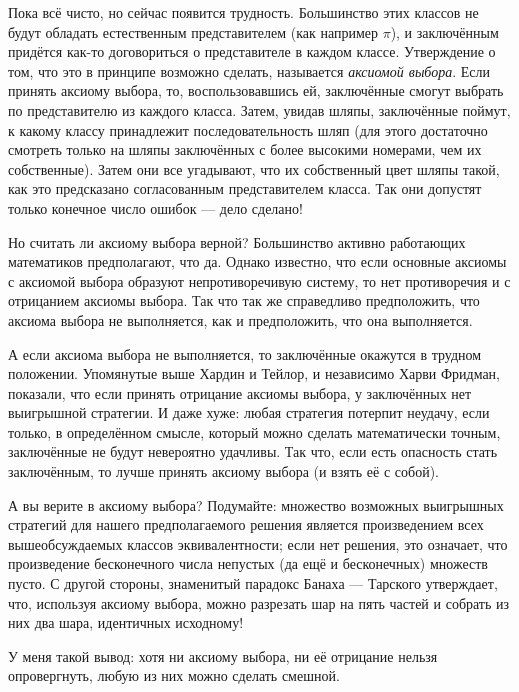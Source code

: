 Пока всё чисто, но сейчас появится трудность.
Большинство этих классов не будут обладать естественным представителем (как например $\pi$),
и заключённым придётся как-то договориться о представителе в каждом классе.
Утверждение о том, что это в принципе возможно сделать, называется \emph{аксиомой выбора}.
Если принять аксиому выбора, то, воспользовавшись ей, заключённые смогут выбрать по представителю из каждого класса.
Затем, увидав шляпы, заключённые поймут, к какому классу принадлежит последовательность шляп (для этого достаточно смотреть только на шляпы заключённых с более высокими номерами, чем их собственные).
Затем они все угадывают, что их собственный цвет шляпы такой, как это предсказано согласованным представителем класса.
Так они допустят только конечное число ошибок --- дело сделано!

Но считать ли аксиому выбора верной?
Большинство активно работающих математиков предполагают, что да.
Однако известно, что если основные аксиомы с аксиомой выбора образуют непротиворечивую систему, то нет противоречия и с отрицанием аксиомы выбора.
Так что так же справедливо предположить, что аксиома выбора не выполняется, как и предположить, что она выполняется.

А если аксиома выбора не выполняется, то заключённые окажутся в трудном положении.
Упомянутые выше Хардин и Тейлор, и независимо Харви Фридман, показали, что если принять отрицание аксиомы выбора, у заключённых нет выигрышной стратегии.
И даже хуже: любая стратегия потерпит неудачу, если только, в определённом смысле, который можно сделать математически точным, заключённые не будут невероятно удачливы.
Так что, если есть опасность стать заключённым, то лучше принять аксиому выбора (и взять её с собой).

А вы верите в аксиому выбора?
Подумайте: множество возможных выигрышных стратегий для нашего предполагаемого решения является произведением всех вышеобсуждаемых классов эквивалентности; если нет решения, это означает, что произведение бесконечного числа непустых (да ещё и бесконечных) множеств пусто.
С другой стороны, знаменитый парадокс Банаха --- Тарского утверждает, что, используя аксиому выбора, можно разрезать шар на пять частей и собрать из них два шара, идентичных исходному!

У меня такой вывод: хотя ни аксиому выбора, ни её отрицание нельзя опровергнуть, любую из них можно сделать смешной.

% 

